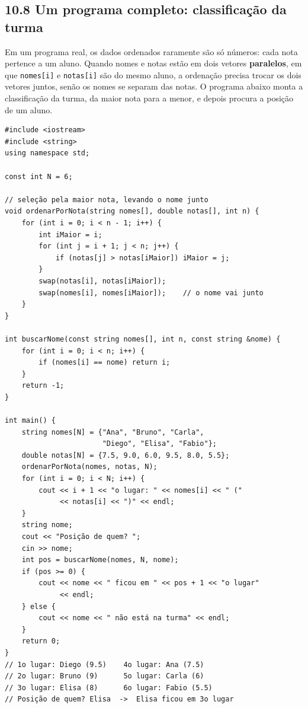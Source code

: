 \subsection{10.8 Um programa completo: classificação da turma}

Em um programa real, os dados ordenados raramente são só números: cada nota pertence a um aluno. Quando nomes e notas estão em dois vetores \textbf{paralelos}, em que \texttt{nomes[i]} e \texttt{notas[i]} são do mesmo aluno, a ordenação precisa trocar os dois vetores juntos, senão os nomes se separam das notas. O programa abaixo monta a classificação da turma, da maior nota para a menor, e depois procura a posição de um aluno.

\begin{codigo}
\begin{Verbatim}[breaklines=true, breaksymbolleft={}, fontsize=\footnotesize]
#include <iostream>
#include <string>
using namespace std;

const int N = 6;

// seleção pela maior nota, levando o nome junto
void ordenarPorNota(string nomes[], double notas[], int n) {
    for (int i = 0; i < n - 1; i++) {
        int iMaior = i;
        for (int j = i + 1; j < n; j++) {
            if (notas[j] > notas[iMaior]) iMaior = j;
        }
        swap(notas[i], notas[iMaior]);
        swap(nomes[i], nomes[iMaior]);    // o nome vai junto
    }
}

int buscarNome(const string nomes[], int n, const string &nome) {
    for (int i = 0; i < n; i++) {
        if (nomes[i] == nome) return i;
    }
    return -1;
}

int main() {
    string nomes[N] = {"Ana", "Bruno", "Carla",
                       "Diego", "Elisa", "Fabio"};
    double notas[N] = {7.5, 9.0, 6.0, 9.5, 8.0, 5.5};
    ordenarPorNota(nomes, notas, N);
    for (int i = 0; i < N; i++) {
        cout << i + 1 << "o lugar: " << nomes[i] << " ("
             << notas[i] << ")" << endl;
    }
    string nome;
    cout << "Posição de quem? ";
    cin >> nome;
    int pos = buscarNome(nomes, N, nome);
    if (pos >= 0) {
        cout << nome << " ficou em " << pos + 1 << "o lugar"
             << endl;
    } else {
        cout << nome << " não está na turma" << endl;
    }
    return 0;
}
// 1o lugar: Diego (9.5)    4o lugar: Ana (7.5)
// 2o lugar: Bruno (9)      5o lugar: Carla (6)
// 3o lugar: Elisa (8)      6o lugar: Fabio (5.5)
// Posição de quem? Elisa  ->  Elisa ficou em 3o lugar
\end{Verbatim}
\end{codigo}

